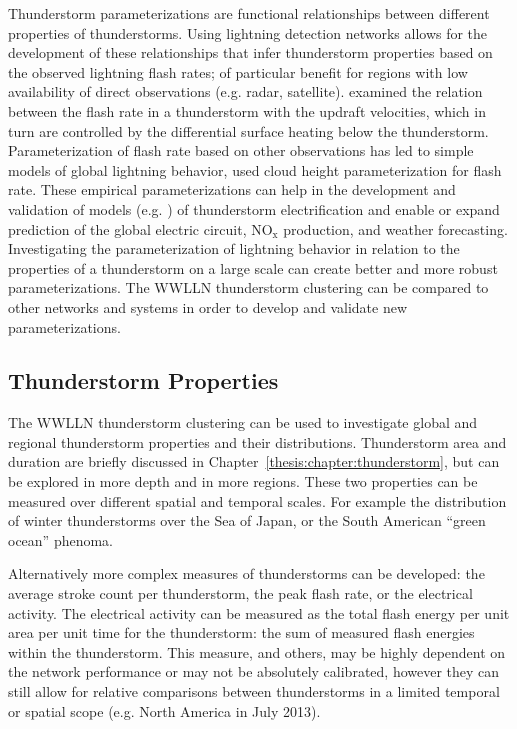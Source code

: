 Thunderstorm parameterizations are functional relationships between different properties of thunderstorms.
Using lightning detection networks allows for the development of these relationships that infer thunderstorm properties based on the observed lightning flash rates; of particular benefit for regions with low availability of direct observations (e.g. radar, satellite).
\citet{Zipser1994} examined the relation between the flash rate in a thunderstorm with the updraft velocities, which in turn are controlled by the differential surface heating below the thunderstorm.
Parameterization of flash rate based on other observations has led to simple models of global lightning behavior, \citet{Price1992} used cloud height parameterization for flash rate.
These empirical parameterizations can help in the development and validation of models (e.g. \citet{Baker1999}) of thunderstorm electrification and enable or expand prediction of the global electric circuit, NO$_\text{x}$ production, and weather forecasting.
Investigating the parameterization of lightning behavior in relation to the properties of a thunderstorm on a large scale can create better and more robust parameterizations.
The WWLLN thunderstorm clustering can be compared to other networks and systems in order to develop and validate new parameterizations.

\subsection{Thunderstorm Properties}

The WWLLN thunderstorm clustering can be used to investigate global and regional thunderstorm properties and their distributions.
Thunderstorm area and duration are briefly discussed in Chapter~\ref{thesis:chapter:thunderstorm}, but can be explored in more depth and in more regions.
These two properties can be measured over different spatial and temporal scales.
For example the distribution of winter thunderstorms over the Sea of Japan, or the South American ``green ocean'' phenoma.

Alternatively more complex measures of thunderstorms can be developed: the average stroke count per thunderstorm, the peak flash rate, or the electrical activity.
The electrical activity can be measured as the total flash energy per unit area per unit time for the thunderstorm: the sum of measured flash energies within the thunderstorm.
This measure, and others, may be highly dependent on the network performance or may not be absolutely calibrated, however they can still allow for relative comparisons between thunderstorms in a limited temporal or spatial scope (e.g. North America in July 2013).

